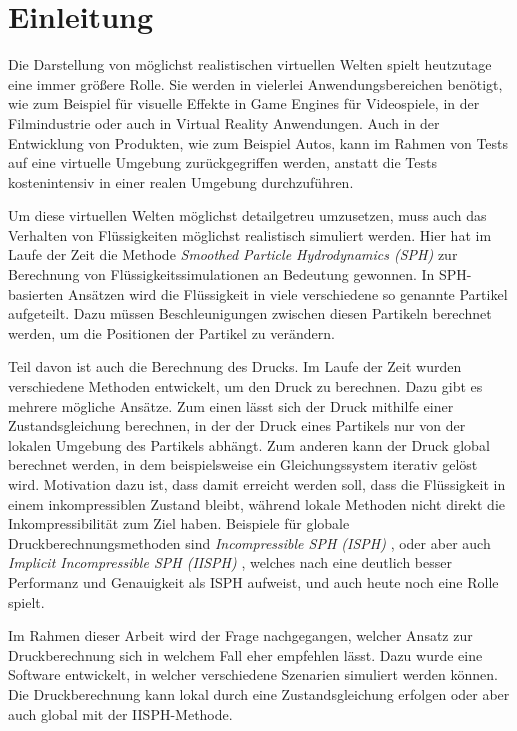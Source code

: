 \documentclass[11pt,
a4paper,
parskip=half, %
BCOR=10mm, %
english,
ngerman]{scrreprt}
\begin{document}
\chapter{Einleitung}
Die Darstellung von möglichst realistischen virtuellen Welten spielt heutzutage eine immer größere Rolle.
Sie werden in vielerlei Anwendungsbereichen benötigt,
wie zum Beispiel für visuelle Effekte in Game Engines für Videospiele, in der Filmindustrie oder auch in Virtual Reality Anwendungen.
Auch in der Entwicklung von Produkten, wie zum Beispiel Autos, kann im Rahmen von Tests auf eine virtuelle Umgebung zurückgegriffen werden,
anstatt die Tests kostenintensiv in einer realen Umgebung durchzuführen.

Um diese virtuellen Welten möglichst detailgetreu umzusetzen, muss auch das Verhalten von Flüssigkeiten möglichst realistisch simuliert werden.
Hier hat im Laufe der Zeit die Methode \textit{Smoothed Particle Hydrodynamics (SPH)} zur Berechnung von Flüssigkeitssimulationen an Bedeutung gewonnen.
In SPH-basierten Ansätzen wird die Flüssigkeit in viele verschiedene so genannte Partikel aufgeteilt.
Dazu müssen Beschleunigungen zwischen diesen Partikeln berechnet werden, um die Positionen der Partikel zu verändern.

Teil davon ist auch die Berechnung des Drucks.
Im Laufe der Zeit wurden verschiedene Methoden entwickelt, um den Druck zu berechnen.
Dazu gibt es mehrere mögliche Ansätze.
Zum einen lässt sich der Druck mithilfe einer Zustandsgleichung berechnen, in der der Druck eines Partikels nur von der lokalen Umgebung des Partikels abhängt.
Zum anderen kann der Druck global berechnet werden, in dem beispielsweise ein Gleichungssystem iterativ gelöst wird.
Motivation dazu ist, dass damit erreicht werden soll, dass die Flüssigkeit in einem inkompressiblen Zustand bleibt,
während lokale Methoden nicht direkt die Inkompressibilität zum Ziel haben.
Beispiele für globale Druckberechnungsmethoden sind \textit{Incompressible SPH (ISPH)} \cite{shao_incompressible_2003}, 
oder aber auch \textit{Implicit Incompressible SPH (IISPH)} \cite{ihmsen_implicit_2014},
welches nach \cite{ihmsen_implicit_2014} eine deutlich besser Performanz und Genauigkeit als ISPH aufweist, und auch heute noch eine Rolle spielt. 

Im Rahmen dieser Arbeit wird der Frage nachgegangen, welcher Ansatz zur Druckberechnung sich in welchem Fall eher empfehlen lässt.
Dazu wurde eine Software entwickelt, in welcher verschiedene Szenarien simuliert werden können.
Die Druckberechnung kann lokal durch eine Zustandsgleichung erfolgen oder aber auch global mit der IISPH-Methode.
\end{document}
